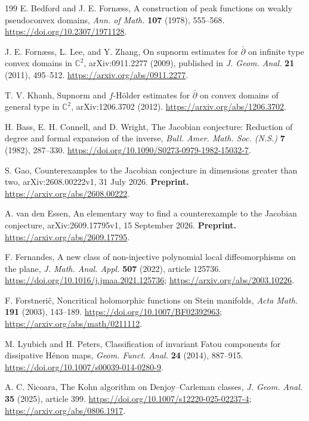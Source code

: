 \documentclass[11pt,reqno]{amsart}
\theoremstyle{definition}
\theoremstyle{remark}
\begin{document}
\begin{thebibliography}{199}
 E. Bedford and J. E. Forn\ae ss, A construction of peak functions on weakly pseudoconvex domains, \emph{Ann. of Math.} \textbf{107} (1978), 555--568. \url{https://doi.org/10.2307/1971128}.

 J. E. Forn\ae ss, L. Lee, and Y. Zhang, On supnorm estimates for $\bar\partial$ on infinite type convex domains in $\mathbb C^2$, arXiv:0911.2277 (2009), published in \emph{J. Geom. Anal.} \textbf{21} (2011), 495--512. \url{https://arxiv.org/abs/0911.2277}.

 T. V. Khanh, Supnorm and $f$-H\"older estimates for $\bar\partial$ on convex domains of general type in $\mathbb C^2$, arXiv:1206.3702 (2012). \url{https://arxiv.org/abs/1206.3702}.

 H. Bass, E. H. Connell, and D. Wright, The Jacobian conjecture: Reduction of degree and formal expansion of the inverse, \emph{Bull. Amer. Math. Soc. (N.S.)} \textbf{7} (1982), 287--330. \url{https://doi.org/10.1090/S0273-0979-1982-15032-7}.

 S. Gao, Counterexamples to the Jacobian conjecture in dimensions greater than two, arXiv:2608.00222v1, 31 July 2026. \textbf{Preprint.} \url{https://arxiv.org/abs/2608.00222}.

 A. van den Essen, An elementary way to find a counterexample to the Jacobian conjecture, arXiv:2609.17795v1, 15 September 2026. \textbf{Preprint.} \url{https://arxiv.org/abs/2609.17795}.

 F. Fernandes, A new class of non-injective polynomial local diffeomorphisms on the plane, \emph{J. Math. Anal. Appl.} \textbf{507} (2022), article 125736. \url{https://doi.org/10.1016/j.jmaa.2021.125736}; \url{https://arxiv.org/abs/2003.10226}.

 F. Forstneri\v c, Noncritical holomorphic functions on Stein manifolds, \emph{Acta Math.} \textbf{191} (2003), 143--189. \url{https://doi.org/10.1007/BF02392963}; \url{https://arxiv.org/abs/math/0211112}.

 M. Lyubich and H. Peters, Classification of invariant Fatou components for dissipative H\'enon maps, \emph{Geom. Funct. Anal.} \textbf{24} (2014), 887--915. \url{https://doi.org/10.1007/s00039-014-0280-9}.

 A. C. Nicoara, The Kohn algorithm on Denjoy--Carleman classes, \emph{J. Geom. Anal.} \textbf{35} (2025), article 399. \url{https://doi.org/10.1007/s12220-025-02237-4}; \url{https://arxiv.org/abs/0806.1917}.


\end{thebibliography}
\end{document}

